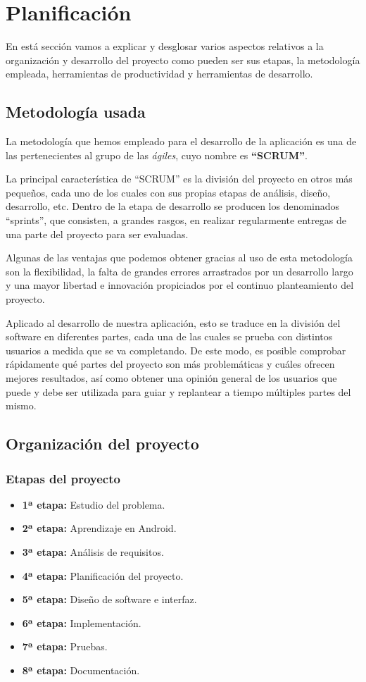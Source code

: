 \chapter{Planificación}
En está sección vamos a explicar y desglosar varios aspectos relativos a la organización y desarrollo del proyecto como pueden ser sus etapas, la metodología empleada, herramientas de productividad y herramientas de desarrollo.

\section{Metodología usada}
La metodología que hemos empleado para el desarrollo de la aplicación es una de las pertenecientes al grupo de las \textit{ágiles}, cuyo nombre es \textbf{``SCRUM''}. 

La principal característica de ``SCRUM'' es la división del proyecto en otros más pequeños, cada uno de los cuales con sus propias etapas de análisis, diseño, desarrollo, etc. Dentro de la etapa de desarrollo se producen los denominados ``sprints'', que consisten, a grandes rasgos, en realizar regularmente entregas de una parte del proyecto para ser evaluadas.

Algunas de las ventajas que podemos obtener gracias al uso de esta metodología son la flexibilidad, la falta de grandes errores arrastrados por un desarrollo largo y una mayor libertad e innovación propiciados por el continuo planteamiento del proyecto\cite{VanessaRosello}.

Aplicado al desarrollo de nuestra aplicación, esto se traduce en la división del software en diferentes partes, cada una de las cuales se prueba con distintos usuarios a medida que se va completando. De este modo, es posible comprobar rápidamente qué partes del proyecto son más problemáticas y cuáles ofrecen mejores resultados, así como obtener una opinión general de los usuarios que puede y debe ser utilizada para guiar y replantear a tiempo múltiples partes del mismo. 

\section{Organización del proyecto}

\subsection{Etapas del proyecto}
\begin{itemize}
  \item \textbf{1ª etapa:} Estudio del problema.
  \item \textbf{2ª etapa:} Aprendizaje en Android.
  \item \textbf{3ª etapa:} Análisis de requisitos.
  \item \textbf{4ª etapa:} Planificación del proyecto.
  \item \textbf{5ª etapa:} Diseño de software e interfaz.
  \item \textbf{6ª etapa:} Implementación.
  \item \textbf{7ª etapa:} Pruebas.
  \item \textbf{8ª etapa:} Documentación.
\end{itemize}

